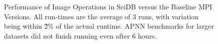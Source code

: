 \documentclass[tog]{acmsiggraph}
\begin{document}
\begin{figure}[htp] \centering
{}
\hspace{1 em}
\hspace{1 em}
	\caption{Performance of Image Operations in SciDB versus the Baseline MPI
Versions. All run-times are the average of 3 runs, with variation being within
\~2\% of the actual runtime. APNN benchmarks for larger datasets did not finish
running even after 6 hours.}
	\label{fig:mpi_result}
\end{figure}
\end{document}
